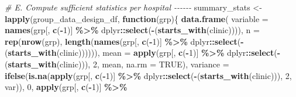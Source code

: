 \documentclass[
]{article}
\newenvironment{Shaded}{\begin{snugshade}}{\end{snugshade}}
\newcommand{\AttributeTok}[1]{\textcolor[rgb]{0.13,0.29,0.53}{#1}}
\newcommand{\CommentTok}[1]{\textcolor[rgb]{0.56,0.35,0.01}{\textit{#1}}}
\newcommand{\ConstantTok}[1]{\textcolor[rgb]{0.56,0.35,0.01}{#1}}
\newcommand{\ControlFlowTok}[1]{\textcolor[rgb]{0.13,0.29,0.53}{\textbf{#1}}}
\newcommand{\DecValTok}[1]{\textcolor[rgb]{0.00,0.00,0.81}{#1}}
\newcommand{\FunctionTok}[1]{\textcolor[rgb]{0.13,0.29,0.53}{\textbf{#1}}}
\newcommand{\NormalTok}[1]{#1}
\newcommand{\OtherTok}[1]{\textcolor[rgb]{0.56,0.35,0.01}{#1}}
\newcommand{\SpecialCharTok}[1]{\textcolor[rgb]{0.81,0.36,0.00}{\textbf{#1}}}
\newcommand{\StringTok}[1]{\textcolor[rgb]{0.31,0.60,0.02}{#1}}
\begin{document}
\begin{Shaded}
\begin{Highlighting}[]
\CommentTok{\# E. Compute sufficient statistics per hospital {-}{-}{-}{-}{-}{-}}
\NormalTok{summary\_stats }\OtherTok{\textless{}{-}} \FunctionTok{lapply}\NormalTok{(group\_data\_design\_df,}
                        \ControlFlowTok{function}\NormalTok{(grp)\{}
                          \FunctionTok{data.frame}\NormalTok{(}
                            \AttributeTok{variable =} \FunctionTok{names}\NormalTok{(grp[, }\FunctionTok{c}\NormalTok{(}\SpecialCharTok{{-}}\DecValTok{1}\NormalTok{)] }\SpecialCharTok{\%\textgreater{}\%} 
\NormalTok{                                               dplyr}\SpecialCharTok{::}\FunctionTok{select}\NormalTok{(}\SpecialCharTok{{-}}\NormalTok{(}\FunctionTok{starts\_with}\NormalTok{(}\StringTok{\textquotesingle{}clinic\textquotesingle{}}\NormalTok{)))),}
                            \AttributeTok{n =} \FunctionTok{rep}\NormalTok{(}\FunctionTok{nrow}\NormalTok{(grp), }\FunctionTok{length}\NormalTok{(}\FunctionTok{names}\NormalTok{(grp[, }\FunctionTok{c}\NormalTok{(}\SpecialCharTok{{-}}\DecValTok{1}\NormalTok{)] }\SpecialCharTok{\%\textgreater{}\%}
\NormalTok{                                                                   dplyr}\SpecialCharTok{::}\FunctionTok{select}\NormalTok{(}\SpecialCharTok{{-}}\NormalTok{(}\FunctionTok{starts\_with}\NormalTok{(}\StringTok{\textquotesingle{}clinic\textquotesingle{}}\NormalTok{)))))),}
                            \AttributeTok{mean =} \FunctionTok{apply}\NormalTok{(grp[, }\FunctionTok{c}\NormalTok{(}\SpecialCharTok{{-}}\DecValTok{1}\NormalTok{)] }\SpecialCharTok{\%\textgreater{}\%}
\NormalTok{                                           dplyr}\SpecialCharTok{::}\FunctionTok{select}\NormalTok{(}\SpecialCharTok{{-}}\NormalTok{(}\FunctionTok{starts\_with}\NormalTok{(}\StringTok{\textquotesingle{}clinic\textquotesingle{}}\NormalTok{))),}
                                         \DecValTok{2}\NormalTok{, mean, }\AttributeTok{na.rm =} \ConstantTok{TRUE}\NormalTok{),}
                            \AttributeTok{variance =} \FunctionTok{ifelse}\NormalTok{(}\FunctionTok{is.na}\NormalTok{(}\FunctionTok{apply}\NormalTok{(grp[, }\FunctionTok{c}\NormalTok{(}\SpecialCharTok{{-}}\DecValTok{1}\NormalTok{)] }\SpecialCharTok{\%\textgreater{}\%}
\NormalTok{                                               dplyr}\SpecialCharTok{::}\FunctionTok{select}\NormalTok{(}\SpecialCharTok{{-}}\NormalTok{(}\FunctionTok{starts\_with}\NormalTok{(}\StringTok{\textquotesingle{}clinic\textquotesingle{}}\NormalTok{))),}
                                             \DecValTok{2}\NormalTok{, var)), }\DecValTok{0}\NormalTok{, }\FunctionTok{apply}\NormalTok{(grp[, }\FunctionTok{c}\NormalTok{(}\SpecialCharTok{{-}}\DecValTok{1}\NormalTok{)] }\SpecialCharTok{\%\textgreater{}\%}

\end{Highlighting}
\end{Shaded}
\end{document}
